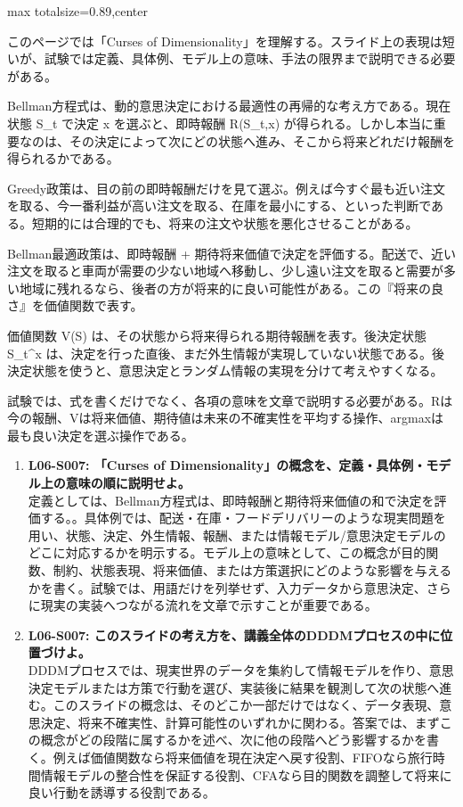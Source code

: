 \begin{minipage}[t]{0.58\textwidth}
\begin{adjustbox}{max totalsize={\textwidth}{0.89\textheight},center}
\begin{minipage}{\textwidth}\scriptsize
{}このページでは「Curses of Dimensionality」を理解する。スライド上の表現は短いが、試験では定義、具体例、モデル上の意味、手法の限界まで説明できる必要がある。\par
Bellman方程式は、動的意思決定における最適性の再帰的な考え方である。現在状態 S\_t で決定 x を選ぶと、即時報酬 R(S\_t,x) が得られる。しかし本当に重要なのは、その決定によって次にどの状態へ進み、そこから将来どれだけ報酬を得られるかである。\par
Greedy政策は、目の前の即時報酬だけを見て選ぶ。例えば今すぐ最も近い注文を取る、今一番利益が高い注文を取る、在庫を最小にする、といった判断である。短期的には合理的でも、将来の注文や状態を悪化させることがある。\par
Bellman最適政策は、即時報酬 + 期待将来価値で決定を評価する。配送で、近い注文を取ると車両が需要の少ない地域へ移動し、少し遠い注文を取ると需要が多い地域に残れるなら、後者の方が将来的に良い可能性がある。この『将来の良さ』を価値関数で表す。\par
価値関数 V(S) は、その状態から将来得られる期待報酬を表す。後決定状態 S\_t\textasciicircum{}x は、決定を行った直後、まだ外生情報が実現していない状態である。後決定状態を使うと、意思決定とランダム情報の実現を分けて考えやすくなる。\par
試験では、式を書くだけでなく、各項の意味を文章で説明する必要がある。Rは今の報酬、Vは将来価値、期待値は未来の不確実性を平均する操作、argmaxは最も良い決定を選ぶ操作である。\par{}\begin{enumerate}\item \textbf{L06-S007: 「Curses of Dimensionality」の概念を、定義・具体例・モデル上の意味の順に説明せよ。}\\定義としては、Bellman方程式は、即時報酬と期待将来価値の和で決定を評価する。。具体例では、配送・在庫・フードデリバリーのような現実問題を用い、状態、決定、外生情報、報酬、または情報モデル/意思決定モデルのどこに対応するかを明示する。モデル上の意味として、この概念が目的関数、制約、状態表現、将来価値、または方策選択にどのような影響を与えるかを書く。試験では、用語だけを列挙せず、入力データから意思決定、さらに現実の実装へつながる流れを文章で示すことが重要である。\item \textbf{L06-S007: このスライドの考え方を、講義全体のDDDMプロセスの中に位置づけよ。}\\DDDMプロセスでは、現実世界のデータを集約して情報モデルを作り、意思決定モデルまたは方策で行動を選び、実装後に結果を観測して次の状態へ進む。このスライドの概念は、そのどこか一部だけではなく、データ表現、意思決定、将来不確実性、計算可能性のいずれかに関わる。答案では、まずこの概念がどの段階に属するかを述べ、次に他の段階へどう影響するかを書く。例えば価値関数なら将来価値を現在決定へ戻す役割、FIFOなら旅行時間情報モデルの整合性を保証する役割、CFAなら目的関数を調整して将来に良い行動を誘導する役割である。\end{enumerate}

\end{minipage}
\end{adjustbox}
\end{minipage}
